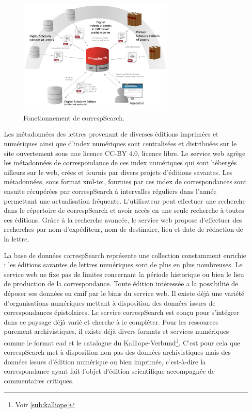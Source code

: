 \documentclass[a4paper, 12pt, twoside]{book}
\begin{document}
\begin{figure}
\centering
\includegraphics[width=0.7\textwidth]{img/correspSearchfonctionnement.png}
\caption{Fonctionnement de correspSearch.}
\vspace{-10pt}
\end{figure}

Les métadonnées des lettres provenant de diverses éditions imprimées et numériques ainsi que d'index numériques sont centralisées et distribuées sur le site ouvertement sous une licence CC-BY 4.0, licence libre. Le service web agrège les métadonnées de correspondance de ces index numériques qui sont hébergés ailleurs sur le web, crées et fournis par divers projets d'éditions savantes. Les métadonnées, sous format \gls{xml}-\gls{tei}, fournies par ces index de correspondances sont ensuite récupérées par correspSearch à intervalles réguliers dans l'année permettant une actualisation fréquente. L'utilisateur peut effectuer une recherche dans le répertoire de correspSearch et avoir accès en une seule recherche à toutes ces éditions. Grâce à la recherche avancée, le service web propose d'effectuer des recherches par nom d'expéditeur, nom de destinaire, lieu et date de rédaction de la lettre. 

La base de données correspSearch représente une collection constamment enrichie : les éditions savantes de lettres numériques sont de plus en plus nombreuses. Le service web ne fixe pas de limites concernant la période historique ou bien le lieu de production de la correspondance. Toute édition intéressée a la possibilité de déposer ses données en \gls{cmif} par le biais du service web. Il existe déjà une variété d'organisations numériques mettant à disposition des données issues de correspondances épistolaires. Le service correspSearch est conçu pour s'intégrer dans ce paysage déjà varié et cherche à le compléter. Pour les ressources purement archivistiques, il existe déjà divers formats et services numériques comme le format \gls{ead} et le catalogue du Kalliope-Verbund\footnote{Voir \autoref{sub:kalliope}}. C'est pour cela que correspSearch met à disposition non pas des données archivistiques mais des données issues d'édition numérique ou bien imprimée, c'est-à-dire la correspondance ayant fait l'objet d'édition scientifique accompagnée de commentaires critiques.
\end{document}

